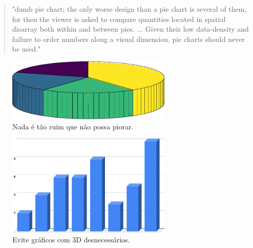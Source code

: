 \begin{frame}
\begin{quote}
"dumb pie chart; the only worse design than a pie chart is several of them,
for then the viewer is asked to compare quantities located in
spatial disarray both within and between pies. ... Given their
low data-density and failure to order numbers along a visual
dimension, pie charts should never be used." \cite{tufte_visual_1999}
\end{quote}

\framebreak

\begin{figure}[h]
 \centering
  \includegraphics[width=0.7\textwidth,height=0.5\textheight,keepaspectratio]{figures/pie3d.pdf}
 \caption{Nada é tão ruim que não possa piorar.}
 \label{fig-pie3d}
\end{figure}

\framebreak

\begin{figure}[h]
 \centering
  \includegraphics[width=0.7\textwidth,height=0.5\textheight,keepaspectratio]{figures/3dbars.pdf}
 \caption{Evite gráficos com 3D desnecessários.}
 \label{fig-3dbars}
\end{figure}

\end{frame}


